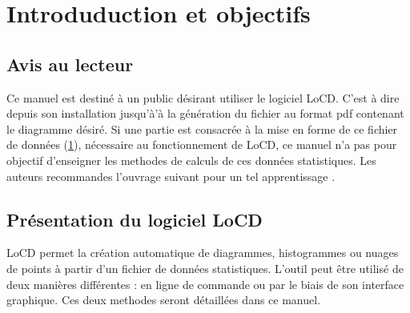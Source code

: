 \chapter{Introduduction et objectifs}\label{chap:fichDonnees}
\section{Avis au lecteur} 
Ce manuel est destiné à un public désirant utiliser le logiciel LoCD. C'est à dire depuis son installation jusqu'à'à la génération du fichier au format pdf contenant le diagramme désiré. Si une partie est consacrée à la mise en forme de ce fichier de données (\ref{chap:fichDonnees}), nécessaire au fonctionnement de LoCD, ce manuel n'a pas pour objectif d'enseigner les methodes de calculs de ces données statistiques. Les auteurs recommandes l'ouvrage suivant pour un tel apprentissage \cite{stat}. 


\section{Présentation du logiciel LoCD}
LoCD permet la création automatique de diagrammes, histogrammes ou nuages de points à partir d'un fichier de données statistiques.  L'outil peut être utilisé de deux manières différentes : en ligne de commande ou par le biais de son interface graphique. Ces deux methodes seront détaillées dans ce manuel. 
